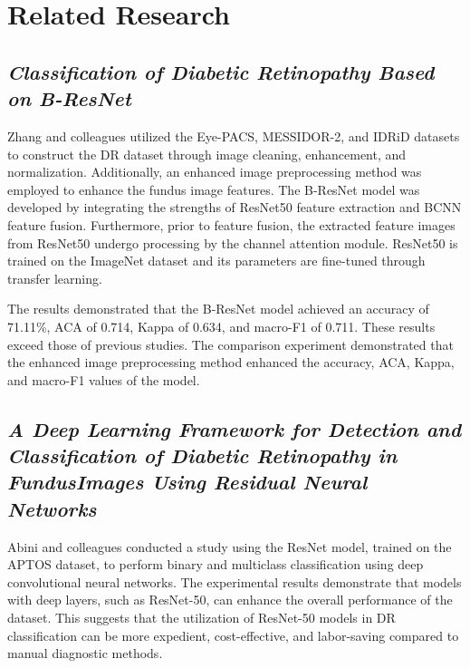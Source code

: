 \section{Related Research}
\label{sec:relatedresearch}

\subsection{\emph{Classification of Diabetic Retinopathy Based on B-ResNet}}
\label{subsec:penelitianTerdahulu1}
 
Zhang and colleagues \citet{zhang2022residual} utilized the Eye-PACS, MESSIDOR-2, and IDRiD datasets to construct the DR dataset through image cleaning, enhancement, and normalization. Additionally, an enhanced image preprocessing method was employed to enhance the fundus image features. The B-ResNet model was developed by integrating the strengths of ResNet50 feature extraction and BCNN feature fusion. Furthermore, prior to feature fusion, the extracted feature images from ResNet50 undergo processing by the channel attention module. ResNet50 is trained on the ImageNet dataset and its parameters are fine-tuned through transfer learning.

The results demonstrated that the B-ResNet model achieved an accuracy of 71.11\%, ACA of 0.714, Kappa of 0.634, and macro-F1 of 0.711. These results exceed those of previous studies. The comparison experiment demonstrated that the enhanced image preprocessing method enhanced the accuracy, ACA, Kappa, and macro-F1 values of the model.

\subsection{\emph{A Deep Learning Framework for Detection and Classification of Diabetic Retinopathy in FundusImages Using Residual Neural Networks}}
\label{subsec:penelitianTerdahulu2} 
Abini and colleagues \citet{10335079} conducted a study using the ResNet model, trained on the APTOS dataset, to perform binary and multiclass classification using deep convolutional neural networks. The experimental results demonstrate that models with deep layers, such as ResNet-50, can enhance the overall performance of the dataset. This suggests that the utilization of ResNet-50 models in DR classification can be more expedient, cost-effective, and labor-saving compared to manual diagnostic methods.
